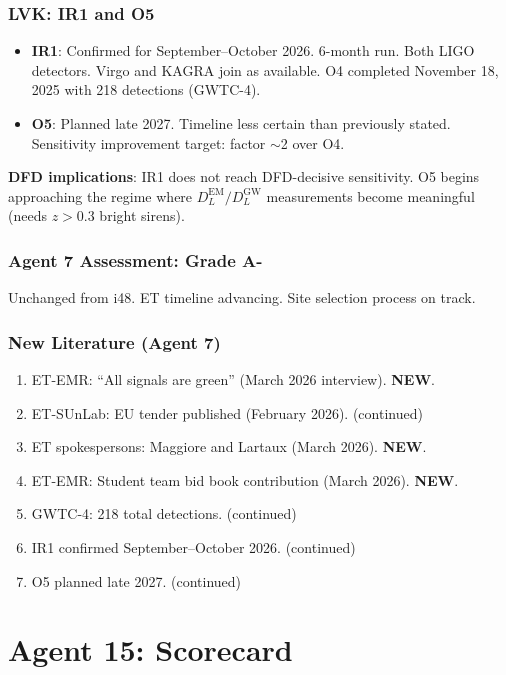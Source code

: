 \documentclass[11pt,a4paper]{article}
\newcommand{\NEW}{\textcolor{dfdblue}{\textbf{NEW}}}
\begin{document}
\section{LVK: IR1 and O5}

\begin{itemize}
\item \textbf{IR1}: Confirmed for September--October 2026. 6-month run. Both LIGO detectors. Virgo and KAGRA join as available. O4 completed November 18, 2025 with 218 detections (GWTC-4).
\item \textbf{O5}: Planned late 2027. Timeline less certain than previously stated. Sensitivity improvement target: factor $\sim$2 over O4.
\end{itemize}

\textbf{DFD implications}: IR1 does not reach DFD-decisive sensitivity. O5 begins approaching the regime where $D_L^{\text{EM}} / D_L^{\text{GW}}$ measurements become meaningful (needs $z > 0.3$ bright sirens).

\section{Agent 7 Assessment: Grade A-}

Unchanged from i48. ET timeline advancing. Site selection process on track.

\section{New Literature (Agent 7)}

\begin{enumerate}
\item ET-EMR: ``All signals are green'' (March 2026 interview). \NEW.
\item ET-SUnLab: EU tender published (February 2026). (continued)
\item ET spokespersons: Maggiore and Lartaux (March 2026). \NEW.
\item ET-EMR: Student team bid book contribution (March 2026). \NEW.
\item GWTC-4: 218 total detections. (continued)
\item IR1 confirmed September--October 2026. (continued)
\item O5 planned late 2027. (continued)
\end{enumerate}


\part{Agent 15: Scorecard}
\label{part:agent15}
\end{document}
